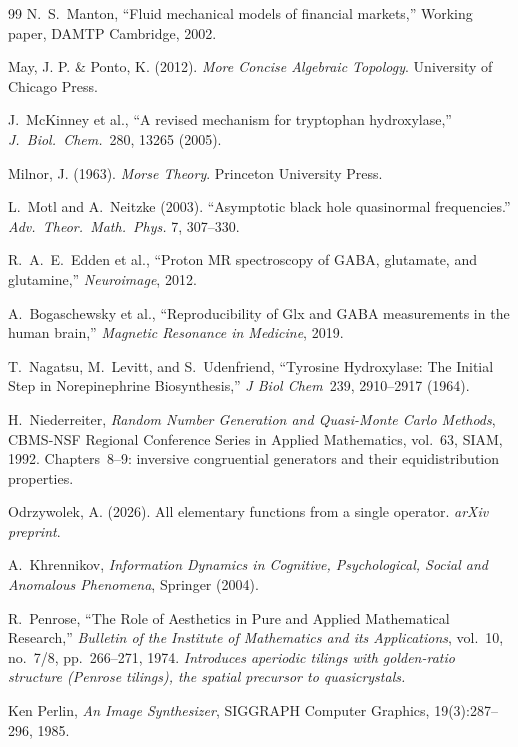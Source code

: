 \documentclass[12pt,oneside]{book}
\theoremstyle{principia}
\theoremstyle{definition}
\theoremstyle{remark}
\begin{document}
\begin{thebibliography}{99}
N.~S.~Manton,
``Fluid mechanical models of financial markets,''
Working paper, DAMTP Cambridge, 2002.

May, J. P. \& Ponto, K. (2012). \emph{More Concise Algebraic Topology}. University of Chicago Press.

J.~McKinney et al., ``A revised mechanism for tryptophan hydroxylase,'' \emph{J.~Biol.~Chem.}\ 280, 13265 (2005).

Milnor, J. (1963). \emph{Morse Theory}. Princeton University Press.

L.~Motl and A.~Neitzke (2003).
``Asymptotic black hole quasinormal frequencies.''
\textit{Adv.\ Theor.\ Math.\ Phys.} 7, 307--330.

R.~A.~E.~Edden et al., ``Proton MR spectroscopy of GABA, glutamate, and glutamine,'' \emph{Neuroimage}, 2012.

A.~Bogaschewsky et al., ``Reproducibility of Glx and GABA measurements in the human brain,'' \emph{Magnetic Resonance in Medicine}, 2019.

T.~Nagatsu, M.~Levitt, and S.~Udenfriend, ``Tyrosine Hydroxylase: The Initial Step in Norepinephrine Biosynthesis,'' \emph{J Biol Chem}\ 239, 2910--2917 (1964).

H.~Niederreiter,
\emph{Random Number Generation and Quasi-Monte Carlo Methods},
CBMS-NSF Regional Conference Series in Applied Mathematics, vol.~63, SIAM, 1992.
Chapters~8--9: inversive congruential generators and their equidistribution properties.

Odrzywolek, A. (2026). All elementary functions from a single operator. \emph{arXiv preprint}.

A.~Khrennikov, \emph{Information Dynamics in Cognitive, Psychological, Social and Anomalous Phenomena}, Springer (2004).

R.~Penrose,
``The Role of Aesthetics in Pure and Applied Mathematical Research,''
\emph{Bulletin of the Institute of Mathematics and its Applications},
vol.~10, no.~7/8, pp.~266--271, 1974.
\textit{Introduces aperiodic tilings with golden-ratio structure (Penrose tilings),
the spatial precursor to quasicrystals.}

Ken Perlin,
\textit{An Image Synthesizer},
SIGGRAPH Computer Graphics, 19(3):287--296, 1985.


\end{thebibliography}
\end{document}
